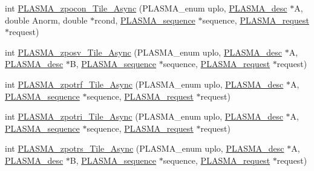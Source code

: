 \begin{DoxyCompactItemize}
int \hyperlink{group__PLASMA__Complex64__t__Tile__Async_ga272215da98b8ba866e53a41270b3826d_ga272215da98b8ba866e53a41270b3826d}{P\+L\+A\+S\+M\+A\+\_\+zpocon\+\_\+\+Tile\+\_\+\+Async} (P\+L\+A\+S\+M\+A\+\_\+enum uplo, \hyperlink{structplasma__desc__t}{P\+L\+A\+S\+M\+A\+\_\+desc} $\ast$A, double Anorm, double $\ast$rcond, \hyperlink{structplasma__sequence__t}{P\+L\+A\+S\+M\+A\+\_\+sequence} $\ast$sequence, \hyperlink{structplasma__request__t}{P\+L\+A\+S\+M\+A\+\_\+request} $\ast$request)
\item 
int \hyperlink{group__PLASMA__Complex64__t__Tile__Async_gaf25c91026a678c4b6489edf98d8f02b1_gaf25c91026a678c4b6489edf98d8f02b1}{P\+L\+A\+S\+M\+A\+\_\+zposv\+\_\+\+Tile\+\_\+\+Async} (P\+L\+A\+S\+M\+A\+\_\+enum uplo, \hyperlink{structplasma__desc__t}{P\+L\+A\+S\+M\+A\+\_\+desc} $\ast$A, \hyperlink{structplasma__desc__t}{P\+L\+A\+S\+M\+A\+\_\+desc} $\ast$B, \hyperlink{structplasma__sequence__t}{P\+L\+A\+S\+M\+A\+\_\+sequence} $\ast$sequence, \hyperlink{structplasma__request__t}{P\+L\+A\+S\+M\+A\+\_\+request} $\ast$request)
\item 
int \hyperlink{group__PLASMA__Complex64__t__Tile__Async_gaecab84c31c6e1658b18868b33478de53_gaecab84c31c6e1658b18868b33478de53}{P\+L\+A\+S\+M\+A\+\_\+zpotrf\+\_\+\+Tile\+\_\+\+Async} (P\+L\+A\+S\+M\+A\+\_\+enum uplo, \hyperlink{structplasma__desc__t}{P\+L\+A\+S\+M\+A\+\_\+desc} $\ast$A, \hyperlink{structplasma__sequence__t}{P\+L\+A\+S\+M\+A\+\_\+sequence} $\ast$sequence, \hyperlink{structplasma__request__t}{P\+L\+A\+S\+M\+A\+\_\+request} $\ast$request)
\item 
int \hyperlink{group__PLASMA__Complex64__t__Tile__Async_ga9c9b672c28f4f191528f07cd0d66774e_ga9c9b672c28f4f191528f07cd0d66774e}{P\+L\+A\+S\+M\+A\+\_\+zpotri\+\_\+\+Tile\+\_\+\+Async} (P\+L\+A\+S\+M\+A\+\_\+enum uplo, \hyperlink{structplasma__desc__t}{P\+L\+A\+S\+M\+A\+\_\+desc} $\ast$A, \hyperlink{structplasma__sequence__t}{P\+L\+A\+S\+M\+A\+\_\+sequence} $\ast$sequence, \hyperlink{structplasma__request__t}{P\+L\+A\+S\+M\+A\+\_\+request} $\ast$request)
\item 
int \hyperlink{group__PLASMA__Complex64__t__Tile__Async_ga493aec60380a3935c89f40c976fbb705_ga493aec60380a3935c89f40c976fbb705}{P\+L\+A\+S\+M\+A\+\_\+zpotrs\+\_\+\+Tile\+\_\+\+Async} (P\+L\+A\+S\+M\+A\+\_\+enum uplo, \hyperlink{structplasma__desc__t}{P\+L\+A\+S\+M\+A\+\_\+desc} $\ast$A, \hyperlink{structplasma__desc__t}{P\+L\+A\+S\+M\+A\+\_\+desc} $\ast$B, \hyperlink{structplasma__sequence__t}{P\+L\+A\+S\+M\+A\+\_\+sequence} $\ast$sequence, \hyperlink{structplasma__request__t}{P\+L\+A\+S\+M\+A\+\_\+request} $\ast$request)

\end{DoxyCompactItemize}
